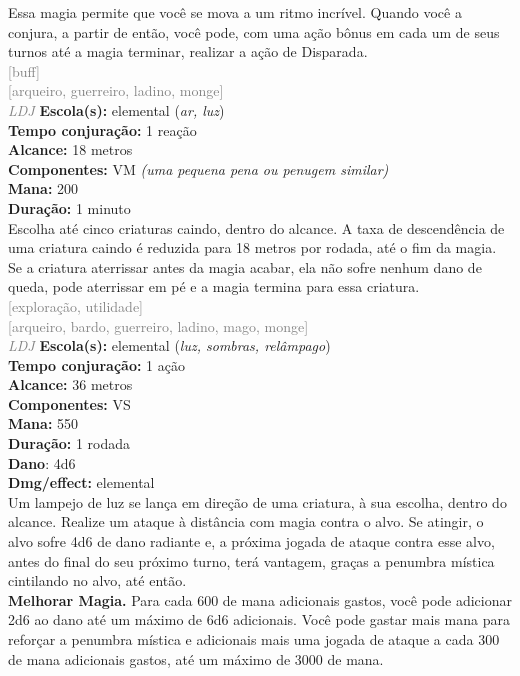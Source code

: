 \documentclass{RPG_Adventure}[2021/10/20]
\begin{document}
{\normalsize Essa magia permite que você se mova a um ritmo incrível. Quando você a conjura, a partir de então, você pode, com uma ação bônus em cada um de seus turnos até a magia terminar, realizar a ação de Disparada.\\}
{\scriptsize \textcolor{gray}{[buff]\\}}
{\scriptsize \textcolor{gray}{[arqueiro, guerreiro, ladino, monge]\\}}
{\tiny \textcolor{gray}{\textit{LDJ}}}
{\small \t \textbf{Escola(s):} elemental (\textit{ar, luz})\\\t \textbf{Tempo conjuração:} 1 reação\\\t \textbf{Alcance:} 18 metros\\\t \textbf{Componentes:} VM \textit{(uma pequena pena ou penugem similar)}\\\t \textbf{Mana:} 200\\\t \textbf{Duração:} 1 minuto\\}
{\normalsize Escolha até cinco criaturas caindo, dentro do alcance. A taxa de descendência de uma criatura caindo é reduzida para 18 metros por rodada, até o fim da magia. Se a criatura aterrissar antes da magia acabar, ela não sofre nenhum dano de queda, pode aterrissar em pé e a magia termina para essa criatura.\\}
{\scriptsize \textcolor{gray}{[exploração, utilidade]\\}}
{\scriptsize \textcolor{gray}{[arqueiro, bardo, guerreiro, ladino, mago, monge]\\}}
{\tiny \textcolor{gray}{\textit{LDJ}}}
{\small \t \textbf{Escola(s):} elemental (\textit{luz, sombras, relâmpago})\\\t \textbf{Tempo conjuração:} 1 ação\\\t \textbf{Alcance:} 36 metros\\\t \textbf{Componentes:} VS\\\t \textbf{Mana:} 550\\\t \textbf{Duração:} 1 rodada\\\t \textbf{Dano}: 4d6\\\t \textbf{Dmg/effect:} elemental\\}
{\normalsize Um lampejo de luz se lança em direção de uma criatura, à sua escolha, dentro do alcance. Realize um ataque à distância com magia contra o alvo. Se atingir, o alvo sofre 4d6 de dano radiante e, a próxima jogada de ataque contra esse alvo, antes do final do seu próximo turno, terá vantagem, graças a penumbra mística cintilando no alvo, até então.\\\t \textbf{Melhorar Magia.} Para cada 600 de mana adicionais gastos, você pode adicionar 2d6 ao dano até um máximo de 6d6 adicionais. Você pode gastar mais mana para reforçar a penumbra mística e adicionais mais uma jogada de ataque a cada 300 de mana adicionais gastos, até um máximo de 3000 de mana.\\}
\end{document}
